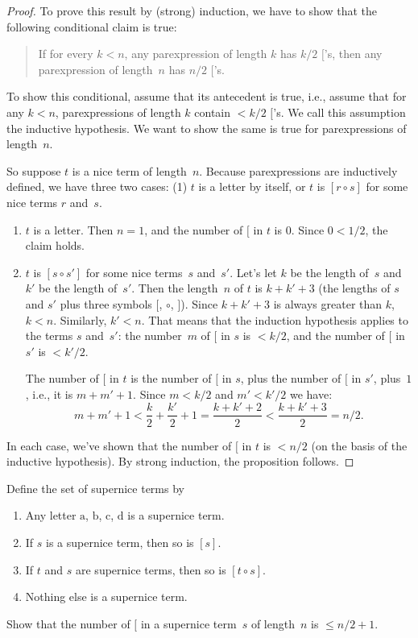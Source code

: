 \documentclass[../../../include/open-logic-section]{subfiles}
\begin{document}
\begin{proof}
To prove this result by (strong) induction, we have to show that the
following conditional claim is true:
\begin{quote}
  If for every $k < n$, any parexpression of length $k$ has $k/2$
  $[$'s, then any parexpression of length~$n$ has $n/2$ $[$'s.
\end{quote}
To show this conditional, assume that its antecedent is true, i.e.,
assume that for any $k<n$, parexpressions of length $k$ contain $< k/2$
$[$'s.  We call this assumption the inductive hypothesis. We want to
show the same is true for parexpressions of length~$n$.

So suppose $t$ is a nice term of length~$n$.  Because
parexpressions are inductively defined, we have three two cases: (1)
$t$ is a letter by itself, or $t$ is $[r \circ s]$ for some nice terms
$r$ and~$s$.
\begin{enumerate}
\item $t$ is a letter.  Then $n = 1$, and the number of $[$ in $t$ is
  $0$. Since $0 < 1/2$, the claim holds.
\item $t$ is $[s \circ s']$ for some nice terms~$s$ and~$s'$.  Let's
  let $k$ be the length of~$s$ and $k'$ be the length of~$s'$.  Then
  the length~$n$ of $t$ is $k+k'+3$ (the lengths of $s$ and $s'$ plus
  three symbols $[$, $\circ$, $]$). Since $k+k'+3$ is always greater
  than $k$, $k < n$. Similarly, $k' < n$. That means that the
  induction hypothesis applies to the terms $s$ and~$s'$: the
  number~$m$ of $[$ in $s$ is $< k/2$, and the number of $[$ in~$s'$ is
  $< k'/2$.

  The number of $[$ in $t$ is the number of $[$ in $s$, plus the
  number of $[$ in $s'$, plus~$1$, i.e., it is $m + m' + 1$. Since $m
  < k/2$ and $m' < k'/2$ we have:
  \[
  m + m' + 1 < \frac{k}{2} + \frac{k'}{2} + 1 = \frac{k+k'+2}{2} < \frac{k+k'+3}{2} = n/2.
  \]
\end{enumerate}
In each case, we've shown that the number of $[$ in $t$ is $< n/2$ (on
the basis of the inductive hypothesis). By strong induction, the
proposition follows.
\end{proof}

\begin{prob}
  Define the set of supernice terms by
  \begin{enumerate}
  \item Any letter $\mathrm{a}$, $\mathrm{b}$, $\mathrm{c}$,
    $\mathrm{d}$ is a supernice term.
  \item If $s$ is a supernice term, then so is $[s]$.
  \item If $t$ and $s$ are supernice terms, then so
    is $[t \circ s]$.
  \item Nothing else is a supernice term.
  \end{enumerate}
  Show that the number of $[$ in a supernice term~$s$ of length~$n$ is
    $\le n/2 +1$.
\end{prob}
\end{document}
